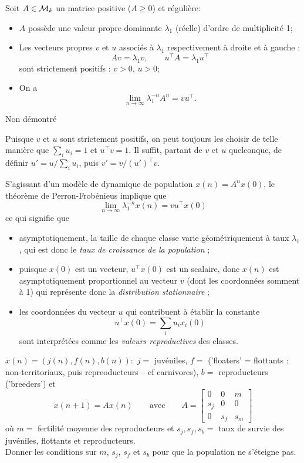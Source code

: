 \begin{theorem*}
  Soit $A \in \mathcal{M}_k$ un matrice positive ($A \geq 0$) et régulière:
  \begin{itemize}
    \item $A$ possède une valeur propre dominante $\lambda_1$ (réelle) d'ordre de multiplicité 1;
    \item Les vecteurs propres $v$ et $u$ associés à $\lambda_1$ respectivement à droite et à gauche : 
    $$
    A v = \lambda_1 v, \qquad u^\top A = \lambda_1 u^\top
    $$
    sont strictement positifs : $v > 0$, $u > 0$;
    \item On a 
    $$
    \lim_{n \rightarrow \infty} \lambda_1^{-n} A^n = v u^\top.
    $$
  \end{itemize}
\end{theorem*}

\proof
Non démontré
\eproof

\remark
Puisque $v$ et $u$ sont strictement positifs, on peut toujours les choisir de telle manière que $\sum_i u_i = 1$ et $u^\top v = 1$. Il suffit, partant de $v$ et $u$ quelconque, de définir $u' = u / \sum_i u_i$, puis $v' = v / (u')^\top v$.

\remark
S'agissant d'un modèle de dynamique de population $x(n) = A^n x(0)$, le théorème de Perron-Frobénieus implique que 
$$
\lim_{n \rightarrow \infty} \lambda_1^{-n} x(n) = v u^\top x(0)
$$
ce qui signifie que
\begin{itemize}
 \item asymptotiquement, la taille de chaque classe varie géométriquement à taux $\lambda_1$, qui est donc le {\em taux de croissance de la population} ; 
 \item puisque $x(0)$ est un vecteur, $u^\top x(0)$ est un scalaire, donc $x(n)$ est asymptotiquement proportionnel au vecteur $v$ (dont les coordonnées somment à 1) qui représente donc la {\em distribution stationnaire} ;
 \item les coordonnées du vecteur $u$ qui contribuent à établir la constante 
 $$
 u^\top x(0) = \sum_i u_i x_i(0)
 $$
 sont interprétées comme les {\em valeurs reproductives} des classes.
\end{itemize}



\begin{exercise*}
  $x(n) = (j(n), f(n), b(n)) :$ $j =$ juvéniles, $f = $ ('floaters' = flottants : non-territoriaux, puis repreoducteurs -- cf carnivores), $b = $ reproducteurs ('breeders') et
  $$
  x(n+1) = A x(n) 
  \qquad \text{avec} \qquad
  A = \left[\begin{array}{ccc} 0 & 0 & m \\ s_j & 0 & 0 \\ 0 & s_f & s_m \end{array}\right]
  $$
  où $m =$ fertilité moyenne des reproducteurs et $s_j, s_f, s_b =$ taux de survie des juvéniles, flottants et reproducteurs. \\
  Donner les conditions sur $m$, $s_j$, $s_f$ et $s_b$ pour que la population ne s'éteigne pas.
\end{exercise*}

